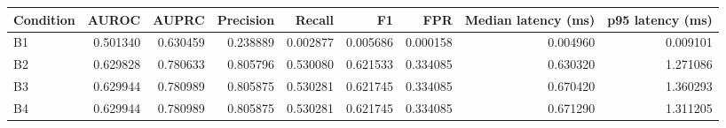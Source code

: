 \begin{tabular}{lrrrrrrrr}
\toprule
Condition & AUROC & AUPRC & Precision & Recall & F1 & FPR & Median latency (ms) & p95 latency (ms) \\
\midrule
B1 & 0.501340 & 0.630459 & 0.238889 & 0.002877 & 0.005686 & 0.000158 & 0.004960 & 0.009101 \\
B2 & 0.629828 & 0.780633 & 0.805796 & 0.530080 & 0.621533 & 0.334085 & 0.630320 & 1.271086 \\
B3 & 0.629944 & 0.780989 & 0.805875 & 0.530281 & 0.621745 & 0.334085 & 0.670420 & 1.360293 \\
B4 & 0.629944 & 0.780989 & 0.805875 & 0.530281 & 0.621745 & 0.334085 & 0.671290 & 1.311205 \\
\bottomrule
\end{tabular}
